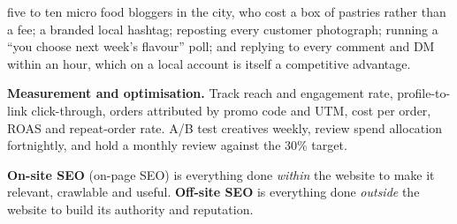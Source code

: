 \begin{qlist}
\begin{apts}
      five to ten micro food bloggers in the city, who cost a box of pastries
      rather than a fee; a branded local hashtag; reposting every customer
      photograph; running a ``you choose next week's flavour'' poll; and
      replying to every comment and DM within an hour, which on a local
      account is itself a competitive advantage.
\item \textbf{Measurement and optimisation.} Track reach and engagement rate,
      profile-to-link click-through, orders attributed by promo code and UTM,
      cost per order, ROAS and repeat-order rate. A/B test creatives weekly,
      review spend allocation fortnightly, and hold a monthly review against
      the 30\% target.
\end{apts}

\textbf{On-site SEO} (on-page SEO) is everything done \emph{within} the website
to make it relevant, crawlable and useful. \textbf{Off-site SEO} is everything
done \emph{outside} the website to build its authority and reputation.


\end{qlist}
